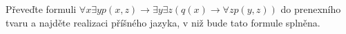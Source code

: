 \subsubsection{}
Převeďte formuli $\forall x \exists y p(x,z) \rightarrow \exists y \exists
z(q(x)\rightarrow \forall z p(y,z))$ do prenexního tvaru a najděte realizaci
příšného jazyka, v niž bude tato formule splněna.
